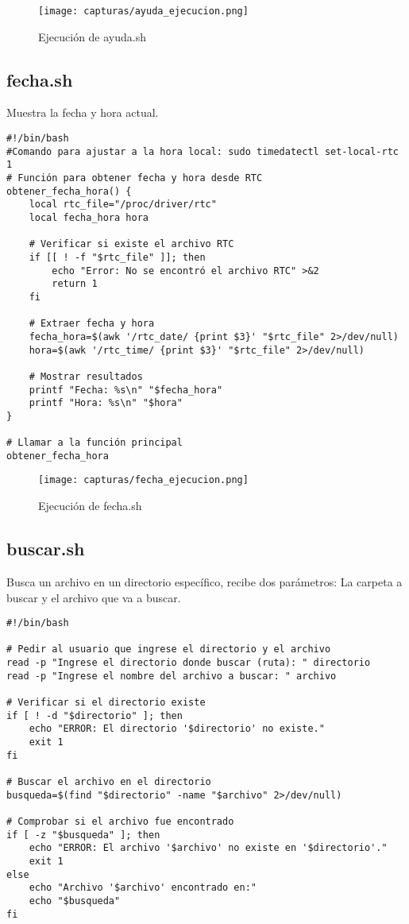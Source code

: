 \documentclass[12pt]{article}
\begin{document}
\begin{figure}[H]
    \centering
    \texttt{[image: capturas/ayuda\_ejecucion.png]}
    \caption{Ejecución de ayuda.sh}
\end{figure}


\newpage
\subsection{fecha.sh}
Muestra la fecha y hora actual.

\begin{lstlisting}[caption={fecha.sh}]
#!/bin/bash
#Comando para ajustar a la hora local: sudo timedatectl set-local-rtc 1
# Función para obtener fecha y hora desde RTC
obtener_fecha_hora() {
    local rtc_file="/proc/driver/rtc"
    local fecha_hora hora
    
    # Verificar si existe el archivo RTC
    if [[ ! -f "$rtc_file" ]]; then
        echo "Error: No se encontró el archivo RTC" >&2
        return 1
    fi

    # Extraer fecha y hora
    fecha_hora=$(awk '/rtc_date/ {print $3}' "$rtc_file" 2>/dev/null)
    hora=$(awk '/rtc_time/ {print $3}' "$rtc_file" 2>/dev/null)

    # Mostrar resultados
    printf "Fecha: %s\n" "$fecha_hora"
    printf "Hora: %s\n" "$hora"
}

# Llamar a la función principal
obtener_fecha_hora
\end{lstlisting}

\begin{figure}[H]
    \centering
    \texttt{[image: capturas/fecha\_ejecucion.png]}
    \caption{Ejecución de fecha.sh}
\end{figure}


\newpage
\subsection{buscar.sh}
Busca un archivo en un directorio específico, recibe dos parámetros: La carpeta a buscar y el archivo que va a buscar.

\begin{lstlisting}[caption={buscar.sh}]
#!/bin/bash

# Pedir al usuario que ingrese el directorio y el archivo
read -p "Ingrese el directorio donde buscar (ruta): " directorio
read -p "Ingrese el nombre del archivo a buscar: " archivo

# Verificar si el directorio existe
if [ ! -d "$directorio" ]; then
    echo "ERROR: El directorio '$directorio' no existe."
    exit 1
fi

# Buscar el archivo en el directorio
busqueda=$(find "$directorio" -name "$archivo" 2>/dev/null)

# Comprobar si el archivo fue encontrado
if [ -z "$busqueda" ]; then
    echo "ERROR: El archivo '$archivo' no existe en '$directorio'."
    exit 1
else
    echo "Archivo '$archivo' encontrado en:"
    echo "$busqueda"
fi
\end{lstlisting}
\end{document}
